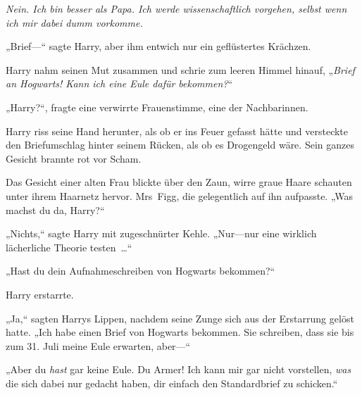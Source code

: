 \emph{Nein. Ich bin besser als Papa. Ich werde wissenschaftlich vorgehen, selbst wenn ich mir dabei dumm vorkomme.}

„Brief—“ sagte Harry, aber ihm entwich nur ein geflüstertes Krächzen.

Harry nahm seinen Mut zusammen und schrie zum leeren Himmel hinauf, „\emph{Brief an Hogwarts! Kann ich eine Eule dafür bekommen?}“

„Harry?“, fragte eine verwirrte Frauenstimme, eine der Nachbarinnen.

Harry riss seine Hand herunter, als ob er ins Feuer gefasst hätte und versteckte den Briefumschlag hinter seinem Rücken, als ob es Drogengeld wäre. Sein ganzes Gesicht brannte rot vor Scham.

Das Gesicht einer alten Frau blickte über den Zaun, wirre graue Haare schauten unter ihrem Haarnetz hervor. Mrs~Figg, die gelegentlich auf ihn aufpasste. „Was machst du da, Harry?“

„Nichts,“ sagte Harry mit zugeschnürter Kehle. „Nur—nur eine wirklich lächerliche Theorie testen …“

„Hast du dein Aufnahmeschreiben von Hogwarts bekommen?“

Harry erstarrte.

„Ja,“ sagten Harrys Lippen, nachdem seine Zunge sich aus der Erstarrung gelöst hatte. „Ich habe einen Brief von Hogwarts bekommen. Sie schreiben, dass sie bis zum 31. Juli meine Eule erwarten, aber—“

„Aber du \emph{hast} gar keine Eule. Du Armer! Ich kann mir gar nicht vorstellen, \emph{was} die sich dabei nur gedacht haben, dir einfach den Standardbrief zu schicken.“

